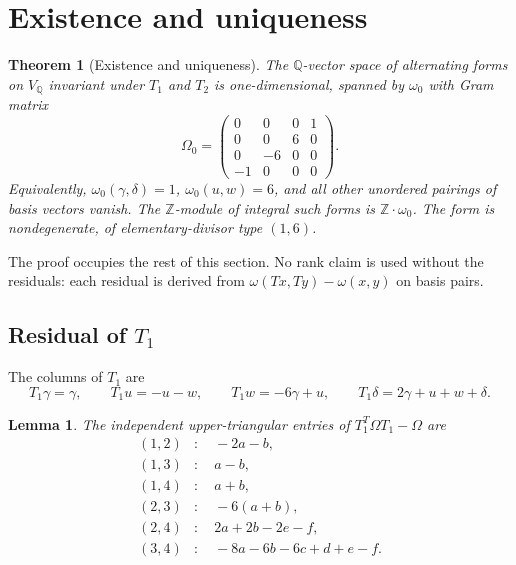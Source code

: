 \documentclass[11pt,a4paper]{article}
\newtheorem{theorem}{Theorem}
\newtheorem{lemma}{Lemma}
\theoremstyle{definition}
\theoremstyle{remark}
\newcommand{\Q}{\mathbb{Q}}
\newcommand{\Z}{\mathbb{Z}}
\begin{document}
\section{Existence and uniqueness}

\begin{theorem}[Existence and uniqueness]\label{thm:A}
The $\Q$-vector space of alternating forms on $V_{\Q}$ invariant under $T_1$ and $T_2$ is one-dimensional, spanned by $\omega_0$ with Gram matrix
\[
\Omega_0=\begin{pmatrix}0&0&0&1\\0&0&6&0\\0&-6&0&0\\-1&0&0&0\end{pmatrix}.
\]
Equivalently, $\omega_0(\gamma,\delta)=1$, $\omega_0(u,w)=6$, and all other unordered pairings of basis vectors vanish. The $\Z$-module of integral such forms is $\Z\cdot\omega_0$. The form is nondegenerate, of elementary-divisor type $(1,6)$.
\end{theorem}

The proof occupies the rest of this section. No rank claim is used without the residuals: each residual is derived from $\omega(Tx,Ty)-\omega(x,y)$ on basis pairs.

\subsection{Residual of $T_1$}

The columns of $T_1$ are
\[
T_1\gamma=\gamma,\qquad T_1u=-u-w,\qquad T_1w=-6\gamma+u,\qquad T_1\delta=2\gamma+u+w+\delta.
\]

\begin{lemma}\label{lem:T1res}
The independent upper-triangular entries of $T_1^T\Omega T_1-\Omega$ are
\begin{align*}
(1,2)&:\quad -2a-b,\\
(1,3)&:\quad a-b,\\
(1,4)&:\quad a+b,\\
(2,3)&:\quad -6(a+b),\\
(2,4)&:\quad 2a+2b-2e-f,\\
(3,4)&:\quad -8a-6b-6c+d+e-f.
\end{align*}
\end{lemma}
\end{document}
